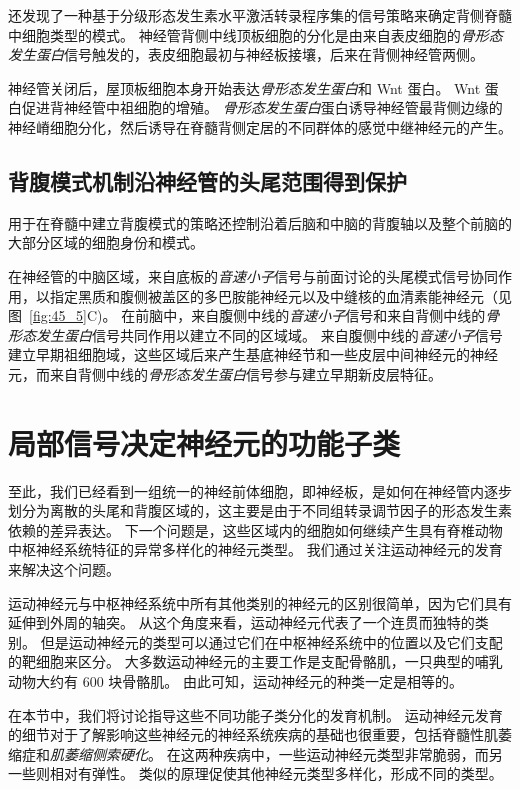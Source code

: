 还发现了一种基于分级形态发生素水平激活转录程序集的信号策略来确定背侧脊髓中细胞类型的模式。
神经管背侧中线顶板细胞的分化是由来自表皮细胞的\textit{骨形态发生蛋白}信号触发的，表皮细胞最初与神经板接壤，后来在背侧神经管两侧。


神经管关闭后，屋顶板细胞本身开始表达\textit{骨形态发生蛋白}和 Wnt 蛋白。
Wnt 蛋白促进背神经管中祖细胞的增殖。
\textit{骨形态发生蛋白}蛋白诱导神经管最背侧边缘的神经嵴细胞分化，然后诱导在脊髓背侧定居的不同群体的感觉中继神经元的产生。



\subsection{背腹模式机制沿神经管的头尾范围得到保护}

用于在脊髓中建立背腹模式的策略还控制沿着后脑和中脑的背腹轴以及整个前脑的大部分区域的细胞身份和模式。


在神经管的中脑区域，来自底板的\textit{音速小子}信号与前面讨论的头尾模式信号协同作用，以指定黑质和腹侧被盖区的多巴胺能神经元以及中缝核的血清素能神经元（见图~\ref{fig:45_5}C)。
在前脑中，来自腹侧中线的\textit{音速小子}信号和来自背侧中线的\textit{骨形态发生蛋白}信号共同作用以建立不同的区域域。
来自腹侧中线的\textit{音速小子}信号建立早期祖细胞域，这些区域后来产生基底神经节和一些皮层中间神经元的神经元，而来自背侧中线的\textit{骨形态发生蛋白}信号参与建立早期新皮层特征。



\section{局部信号决定神经元的功能子类}

至此，我们已经看到一组统一的神经前体细胞，即神经板，是如何在神经管内逐步划分为离散的头尾和背腹区域的，这主要是由于不同组转录调节因子的形态发生素依赖的差异表达。
下一个问题是，这些区域内的细胞如何继续产生具有脊椎动物中枢神经系统特征的异常多样化的神经元类型。
我们通过关注运动神经元的发育来解决这个问题。


运动神经元与中枢神经系统中所有其他类别的神经元的区别很简单，因为它们具有延伸到外周的轴突。
从这个角度来看，运动神经元代表了一个连贯而独特的类别。
但是运动神经元的类型可以通过它们在中枢神经系统中的位置以及它们支配的靶细胞来区分。
大多数运动神经元的主要工作是支配骨骼肌，一只典型的哺乳动物大约有 600 块骨骼肌。
由此可知，运动神经元的种类一定是相等的。


在本节中，我们将讨论指导这些不同功能子类分化的发育机制。
运动神经元发育的细节对于了解影响这些神经元的神经系统疾病的基础也很重要，包括脊髓性肌萎缩症和\textit{肌萎缩侧索硬化}。
在这两种疾病中，一些运动神经元类型非常脆弱，而另一些则相对有弹性。
类似的原理促使其他神经元类型多样化，形成不同的类型。



